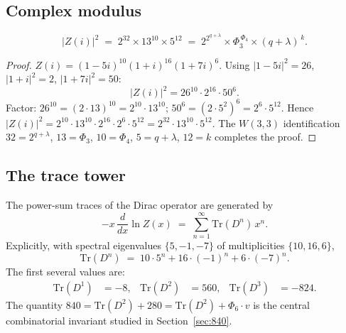 \subsection{Complex modulus}

\begin{proposition}
\label{prop:Z_modulus}
\begin{equation}
  \label{eq:Z_mod}
  \bigl|Z(i)\bigr|^2 \;=\; 2^{32} \times 13^{10} \times 5^{12}
    \;=\; 2^{2^{q+\lambda}} \times \Phi_3^{\,\Phi_4} \times (q+\lambda)^{\,k}.
\end{equation}
\end{proposition}

\begin{proof}
$Z(i) = (1-5i)^{10}(1+i)^{16}(1+7i)^6$.  Using $|1-5i|^2=26$,
$|1+i|^2=2$, $|1+7i|^2=50$:
\[
  |Z(i)|^2 = 26^{10}\cdot 2^{16}\cdot 50^6.
\]
Factor: $26^{10}=(2\cdot 13)^{10}=2^{10}\cdot 13^{10}$;
$50^6=(2\cdot 5^2)^6=2^6\cdot 5^{12}$.  Hence
$|Z(i)|^2 = 2^{10}\cdot 13^{10}\cdot 2^{16}\cdot 2^6\cdot 5^{12}
= 2^{32}\cdot 13^{10}\cdot 5^{12}$.
The $W(3,3)$ identification $32=2^{q+\lambda}$, $13=\Phi_3$, $10=\Phi_4$,
$5=q+\lambda$, $12=k$ completes the proof.
\end{proof}

\subsection{The trace tower}

\begin{theorem}
\label{thm:trace_tower}
The power-sum traces of the Dirac operator are generated by
\begin{equation}
  \label{eq:trace_gen}
  -x\,\frac{d}{dx}\ln Z(x) \;=\; \sum_{n=1}^{\infty} \mathrm{Tr}(D^n)\,x^n.
\end{equation}
Explicitly, with spectral eigenvalues $\{5,-1,-7\}$ of multiplicities
$\{10,16,6\}$,
\begin{equation}
  \label{eq:trace_formula}
  \mathrm{Tr}(D^n) \;=\; 10\cdot 5^n + 16\cdot (-1)^n + 6\cdot (-7)^n.
\end{equation}
The first several values are:
\begin{align}
  \mathrm{Tr}(D^1) &= -8, &
  \mathrm{Tr}(D^2) &= 560, &
  \mathrm{Tr}(D^3) &= -824.
\end{align}
The quantity $840 = \mathrm{Tr}(D^2) + 280 = \mathrm{Tr}(D^2) + \Phi_6\cdot v$
is the central combinatorial invariant studied in Section~\ref{sec:840}.
\end{theorem}

